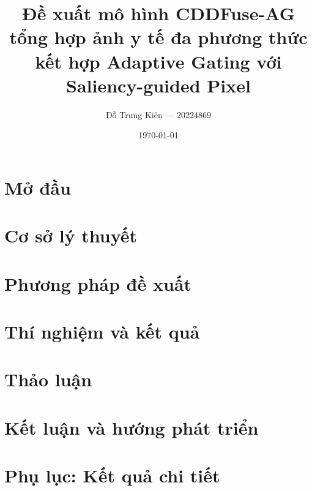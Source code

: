 \documentclass[12pt,a4paper,oneside]{report}
\title{\textbf{Đề xuất mô hình CDDFuse-AG tổng hợp ảnh y tế đa phương thức kết hợp Adaptive Gating với Saliency-guided Pixel}}
\author{Đỗ Trung Kiên --- 20224869}
\date{\today}
\begin{document}


\tableofcontents
\listoffigures
\listoftables



\chapter{Mở đầu}\label{ch:intro}


\chapter{Cơ sở lý thuyết}\label{ch:background}


\chapter{Phương pháp đề xuất}\label{ch:method}


\chapter{Thí nghiệm và kết quả}\label{ch:results}


\chapter{Thảo luận}\label{ch:discussion}


\chapter{Kết luận và hướng phát triển}\label{ch:conclusion}





\appendix
\chapter{Phụ lục: Kết quả chi tiết}\label{ch:appendix}

\end{document}
